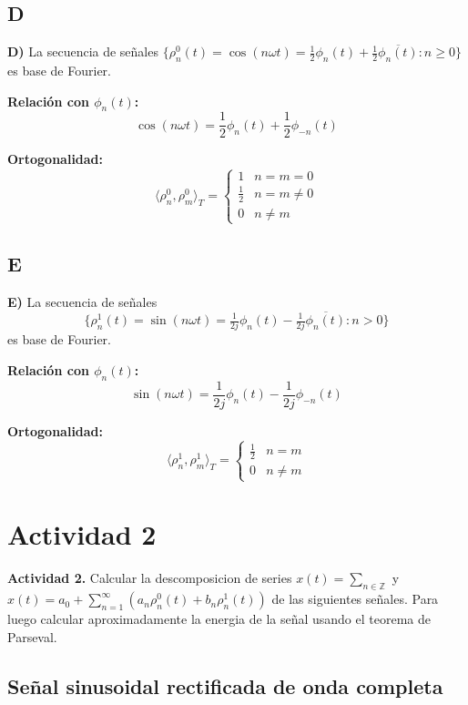 \vspace{0.5cm}

\subsection{D}

\textbf{D)} La secuencia de señales $\{ \rho_n^0(t) = \cos(n\omega t) = \tfrac{1}{2}\phi_n(t) + \tfrac{1}{2}\overline{\phi_n(t)} : n \geq 0 \}$ es base de Fourier.

\textbf{Relación con $\phi_n(t)$:}
\[
\cos(n\omega t) = \frac{1}{2}\phi_n(t) + \frac{1}{2}\phi_{-n}(t)
\]

\textbf{Ortogonalidad:}
\[
\langle \rho_n^0, \rho_m^0 \rangle_T = 
\begin{cases}
1 & n = m = 0 \\
\frac{1}{2} & n = m \neq 0 \\
0 & n \neq m
\end{cases}
\]

\vspace{0.5cm}

\subsection{E}

\textbf{E)} La secuencia de señales \[\{ \rho_n^1(t) = \sin(n\omega t) = \tfrac{1}{2j}\phi_n(t) - \tfrac{1}{2j}\overline{\phi_n(t)} : n > 0 \}\] es base de Fourier.

\textbf{Relación con $\phi_n(t)$:}
\[
\sin(n\omega t) = \frac{1}{2j}\phi_n(t) - \frac{1}{2j}\phi_{-n}(t)
\]

\textbf{Ortogonalidad:}
\[
\langle \rho_n^1, \rho_m^1 \rangle_T = 
\begin{cases}
\frac{1}{2} & n = m \\
0 & n \neq m
\end{cases}
\]

\section{Actividad 2}

\textbf{Actividad 2.} Calcular la descomposicion de series $x(t) = \sum_{n \in \mathbb{Z}}$ y $x(t) = a_0 + \sum_{n=1}^{\infty}(a_n \rho_n ^0(t) + b_n \rho_n ^1(t))$ de las siguientes se\~nales. Para luego calcular aproximadamente la energia de la se\~nal usando el teorema de Parseval.

\subsection{Se\~nal sinusoidal rectificada de onda completa}

